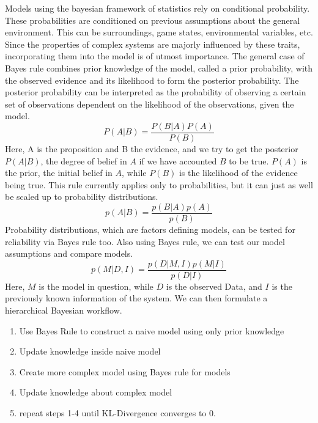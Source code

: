 Models using the bayesian framework of statistics rely on conditional probability. These probabilities are conditioned on previous assumptions about the general environment. This can be surroundings, game states, environmental variables, etc. Since the properties of complex systems are majorly influenced by these traits, incorporating them into the model is of utmost importance. The general case of Bayes rule combines prior knowledge of the model, called a prior probability, with the observed evidence and its likelihood to form the posterior probability. The posterior probability can be interpreted as the probability of observing a certain set of observations dependent on the likelihood of the observations, given the model. 
\begin{equation}%
	P(A|B) = \frac{P(B|A) P(A)}{P(B)}
\label{Bayes Rule for probabilities. }
\end{equation}
Here, A is the proposition and B the evidence, and we try to get the posterior $P(A|B)$, the degree of belief in $A$ if we have accounted $B$ to be true. $P(A)$ is the prior, the initial belief in $A$, while $P(B)$ is the likelihood of the evidence being true. This rule currently applies only to probabilities, but it can just as well be scaled up to probability distributions.
\begin{equation}%
	p(A|B) = \frac{p(B|A) p(A)}{p(B)}
\label{Bayes Rule for probability distributions. }
\end{equation}
Probability distributions, which are factors defining models, can be tested for reliability via Bayes rule too. Also using Bayes rule, we can test our model assumptions and compare models. 
\begin{equation}%
	p(M|D,I) = \frac{p(D|M,I) p(M|I)}{p(D|I)}
\label{Bayes Rule for Model Comparison}
\end{equation}
Here, $M$ is the model in question, while $D$ is the observed Data, and $I$ is the previously known information of the system. We can then formulate a hierarchical Bayesian workflow.
\begin{enumerate}%
	\item Use Bayes Rule to construct a naive model using only prior knowledge
	\item Update knowledge inside naive model 
	\item Create more complex model using Bayes rule for models
	\item Update knowledge about complex model
	\item repeat steps 1-4 until KL-Divergence converges to 0.
\end{enumerate}
